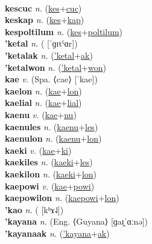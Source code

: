  \label{kesmyawf} \\
\textbf{kescuc} \textit{n.} (\hyperref[kes]{kes}+\hyperref[cuc]{cuc})
 \label{kescuc} \\
\textbf{keskap} \textit{n.} (\hyperref[kes]{kes}+\hyperref[kap]{kap})
 \label{keskap} \\
\textbf{kespoltilum} \textit{n.} (\hyperref[kes]{kes}+\hyperref[poltilum]{poltilum})
 \label{kespoltilum} \\
\textbf{'ketal} \textit{n.} ( [ˈɡɪtˤɑr])
 \label{'ketal} \\
\textbf{'ketalak} \textit{n.} (\hyperref['ketal]{'ketal}+\hyperref[ak]{ak})
 \label{'ketalak} \\
\textbf{'ketalwon} \textit{n.} (\hyperref['ketal]{'ketal}+\hyperref[won]{won})
 \label{'ketalwon} \\
\textbf{kae} \textit{v.} (Spa. ⟨cae⟩ [ˈkae])
 \label{kae} \\
\textbf{kaelon} \textit{n.} (\hyperref[kae]{kae}+\hyperref[lon]{lon})
 \label{kaelon} \\
\textbf{kaelial} \textit{n.} (\hyperref[kae]{kae}+\hyperref[lial]{lial})
 \label{kaelial} \\
\textbf{kaenu} \textit{v.} (\hyperref[kae]{kae}+\hyperref[nu]{nu})
 \label{kaenu} \\
\textbf{kaenules} \textit{n.} (\hyperref[kaenu]{kaenu}+\hyperref[les]{les})
 \label{kaenules} \\
\textbf{kaenulon} \textit{n.} (\hyperref[kaenu]{kaenu}+\hyperref[lon]{lon})
 \label{kaenulon} \\
\textbf{kaeki} \textit{v.} (\hyperref[kae]{kae}+\hyperref[ki]{ki})
 \label{kaeki} \\
\textbf{kaekiles} \textit{n.} (\hyperref[kaeki]{kaeki}+\hyperref[les]{les})
 \label{kaekiles} \\
\textbf{kaekilon} \textit{n.} (\hyperref[kaeki]{kaeki}+\hyperref[lon]{lon})
 \label{kaekilon} \\
\textbf{kaepowi} \textit{v.} (\hyperref[kae]{kae}+\hyperref[powi]{powi})
 \label{kaepowi} \\
\textbf{kaepowilon} \textit{n.} (\hyperref[kaepowi]{kaepowi}+\hyperref[lon]{lon})
 \label{kaepowilon} \\
\textbf{'kao} \textit{n.} ( [kʰɤ˨˩])
 \label{'kao} \\
\textbf{'kayana} \textit{n.} (Eng. ⟨Guyana⟩ [ɡaɪ̯ˈɑːnə])
 \label{'kayana} \\
\textbf{'kayanaak} \textit{n.} (\hyperref['kayana]{'kayana}+\hyperref[ak]{ak})
